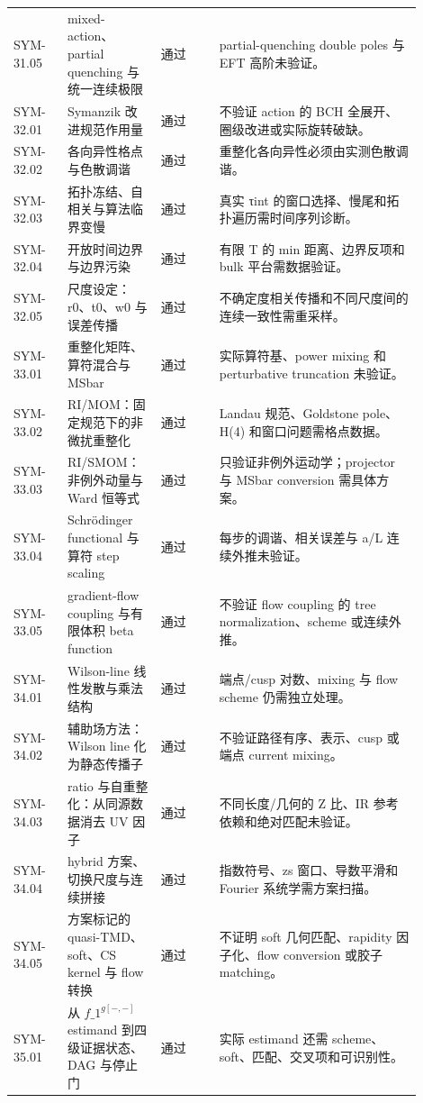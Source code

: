 \begin{longtable}{p{0.12\linewidth}p{0.20\linewidth}p{0.13\linewidth}p{0.45\linewidth}}
SYM-31.05 & mixed-action、partial quenching 与统一连续极限 & 通过 & partial-quenching double poles 与 EFT 高阶未验证。\\
SYM-32.01 & Symanzik 改进规范作用量 & 通过 & 不验证 action 的 BCH 全展开、圈级改进或实际旋转破缺。\\
SYM-32.02 & 各向异性格点与色散调谐 & 通过 & 重整化各向异性必须由实测色散调谐。\\
SYM-32.03 & 拓扑冻结、自相关与算法临界变慢 & 通过 & 真实 τint 的窗口选择、慢尾和拓扑遍历需时间序列诊断。\\
SYM-32.04 & 开放时间边界与边界污染 & 通过 & 有限 T 的 min 距离、边界反项和 bulk 平台需数据验证。\\
SYM-32.05 & 尺度设定：r0、t0、w0 与误差传播 & 通过 & 不确定度相关传播和不同尺度间的连续一致性需重采样。\\
SYM-33.01 & 重整化矩阵、算符混合与 MSbar & 通过 & 实际算符基、power mixing 和 perturbative truncation 未验证。\\
SYM-33.02 & RI/MOM：固定规范下的非微扰重整化 & 通过 & Landau 规范、Goldstone pole、H(4) 和窗口问题需格点数据。\\
SYM-33.03 & RI/SMOM：非例外动量与 Ward 恒等式 & 通过 & 只验证非例外运动学；projector 与 MSbar conversion 需具体方案。\\
SYM-33.04 & Schrödinger functional 与算符 step scaling & 通过 & 每步的调谐、相关误差与 a/L 连续外推未验证。\\
SYM-33.05 & gradient-flow coupling 与有限体积 beta function & 通过 & 不验证 flow coupling 的 tree normalization、scheme 或连续外推。\\
SYM-34.01 & Wilson-line 线性发散与乘法结构 & 通过 & 端点/cusp 对数、mixing 与 flow scheme 仍需独立处理。\\
SYM-34.02 & 辅助场方法：Wilson line 化为静态传播子 & 通过 & 不验证路径有序、表示、cusp 或端点 current mixing。\\
SYM-34.03 & ratio 与自重整化：从同源数据消去 UV 因子 & 通过 & 不同长度/几何的 Z 比、IR 参考依赖和绝对匹配未验证。\\
SYM-34.04 & hybrid 方案、切换尺度与连续拼接 & 通过 & 指数符号、zs 窗口、导数平滑和 Fourier 系统学需方案扫描。\\
SYM-34.05 & 方案标记的 quasi-TMD、soft、CS kernel 与 flow 转换 & 通过 & 不证明 soft 几何匹配、rapidity 因子化、flow conversion 或胶子 matching。\\
SYM-35.01 & 从 $f\_1^{g[-,-]}$ estimand 到四级证据状态、DAG 与停止门 & 通过 & 实际 estimand 还需 scheme、soft、匹配、交叉项和可识别性。\\

\end{longtable}
